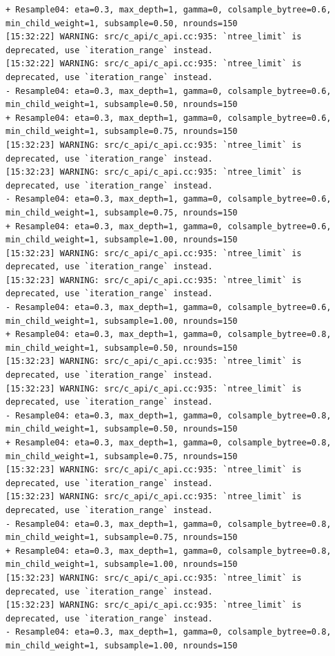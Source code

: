 \documentclass[
  letterpaper,
  DIV=11,
  numbers=noendperiod]{scrartcl}
\begin{document}
\begin{verbatim}
+ Resample04: eta=0.3, max_depth=1, gamma=0, colsample_bytree=0.6, min_child_weight=1, subsample=0.50, nrounds=150 
[15:32:22] WARNING: src/c_api/c_api.cc:935: `ntree_limit` is deprecated, use `iteration_range` instead.
[15:32:22] WARNING: src/c_api/c_api.cc:935: `ntree_limit` is deprecated, use `iteration_range` instead.
- Resample04: eta=0.3, max_depth=1, gamma=0, colsample_bytree=0.6, min_child_weight=1, subsample=0.50, nrounds=150 
+ Resample04: eta=0.3, max_depth=1, gamma=0, colsample_bytree=0.6, min_child_weight=1, subsample=0.75, nrounds=150 
[15:32:23] WARNING: src/c_api/c_api.cc:935: `ntree_limit` is deprecated, use `iteration_range` instead.
[15:32:23] WARNING: src/c_api/c_api.cc:935: `ntree_limit` is deprecated, use `iteration_range` instead.
- Resample04: eta=0.3, max_depth=1, gamma=0, colsample_bytree=0.6, min_child_weight=1, subsample=0.75, nrounds=150 
+ Resample04: eta=0.3, max_depth=1, gamma=0, colsample_bytree=0.6, min_child_weight=1, subsample=1.00, nrounds=150 
[15:32:23] WARNING: src/c_api/c_api.cc:935: `ntree_limit` is deprecated, use `iteration_range` instead.
[15:32:23] WARNING: src/c_api/c_api.cc:935: `ntree_limit` is deprecated, use `iteration_range` instead.
- Resample04: eta=0.3, max_depth=1, gamma=0, colsample_bytree=0.6, min_child_weight=1, subsample=1.00, nrounds=150 
+ Resample04: eta=0.3, max_depth=1, gamma=0, colsample_bytree=0.8, min_child_weight=1, subsample=0.50, nrounds=150 
[15:32:23] WARNING: src/c_api/c_api.cc:935: `ntree_limit` is deprecated, use `iteration_range` instead.
[15:32:23] WARNING: src/c_api/c_api.cc:935: `ntree_limit` is deprecated, use `iteration_range` instead.
- Resample04: eta=0.3, max_depth=1, gamma=0, colsample_bytree=0.8, min_child_weight=1, subsample=0.50, nrounds=150 
+ Resample04: eta=0.3, max_depth=1, gamma=0, colsample_bytree=0.8, min_child_weight=1, subsample=0.75, nrounds=150 
[15:32:23] WARNING: src/c_api/c_api.cc:935: `ntree_limit` is deprecated, use `iteration_range` instead.
[15:32:23] WARNING: src/c_api/c_api.cc:935: `ntree_limit` is deprecated, use `iteration_range` instead.
- Resample04: eta=0.3, max_depth=1, gamma=0, colsample_bytree=0.8, min_child_weight=1, subsample=0.75, nrounds=150 
+ Resample04: eta=0.3, max_depth=1, gamma=0, colsample_bytree=0.8, min_child_weight=1, subsample=1.00, nrounds=150 
[15:32:23] WARNING: src/c_api/c_api.cc:935: `ntree_limit` is deprecated, use `iteration_range` instead.
[15:32:23] WARNING: src/c_api/c_api.cc:935: `ntree_limit` is deprecated, use `iteration_range` instead.
- Resample04: eta=0.3, max_depth=1, gamma=0, colsample_bytree=0.8, min_child_weight=1, subsample=1.00, nrounds=150 

\end{verbatim}
\end{document}
